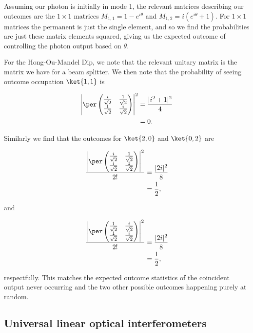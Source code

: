 Assuming our photon is initially in mode 1, the relevant matrices describing our outcomes are the $1\times 1$ matrices $M_{1,1} = 1-e^{i\theta}$ and $M_{1,2} = i(e^{i\theta}+1)$. For $1\times 1$ matrices the permanent is just the single element, and so we find the probabilities are just these matrix elements squared, giving us the expected outcome of controlling the photon output based on $\theta$.

For the Hong-Ou-Mandel Dip, we note that the relevant unitary matrix is the matrix we have for a beam splitter. We then note that the probability of seeing outcome occupation $\ket{1,1}$ is

\begin{align}
\left|\per\begin{pmatrix}\frac{i}{\sqrt{2}}&\frac{1}{\sqrt{2}}\\\frac{1}{\sqrt{2}}&\frac{i}{\sqrt{2}}\end{pmatrix}\right|^2 &= \frac{|i^2+1|^2}{4}\\
&= 0.
\end{align}

Similarly we find that the outcomes for $\ket{2,0}$ and $\ket{0,2}$ are

\begin{align}
\frac{\left|\per\begin{pmatrix}\frac{i}{\sqrt{2}}&\frac{1}{\sqrt{2}}\\\frac{i}{\sqrt{2}}&\frac{1}{\sqrt{2}}\end{pmatrix}\right|^2}{2!} &= \frac{|2i|^2}{8}\\
&= \frac{1}{2},
\end{align}

\noindent and

\begin{align}
\frac{\left|\per\begin{pmatrix}\frac{1}{\sqrt{2}}&\frac{i}{\sqrt{2}}\\\frac{1}{\sqrt{2}}&\frac{i}{\sqrt{2}}\end{pmatrix}\right|^2}{2!} &= \frac{|2i|^2}{8}\\
&= \frac{1}{2},
\end{align}

\noindent respectfully. This matches the expected outcome statistics of the coincident output never occurring and the two other possible outcomes happening purely at random.

\subsection{Universal linear optical interferometers}


